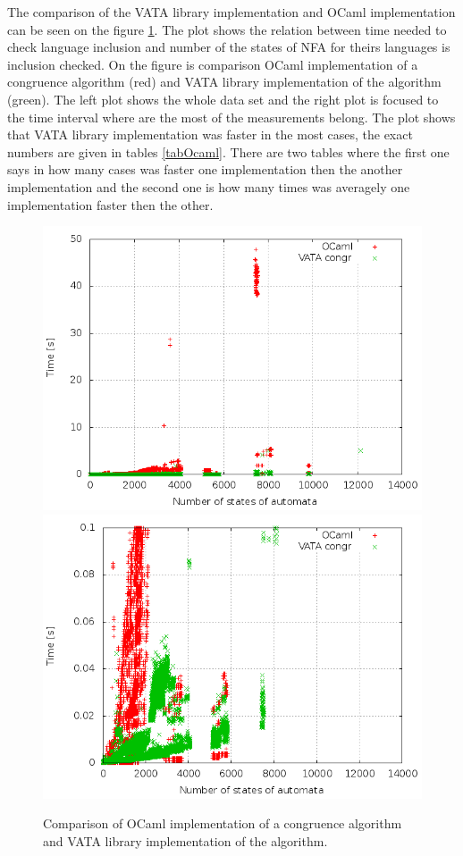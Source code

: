 The comparison of the VATA library implementation and OCaml implementation can be seen on the figure \ref{figGraphOCaml}. The plot shows the relation between 
time needed to check language inclusion and number of the states of NFA for theirs languages is inclusion checked.
On the figure is comparison OCaml implementation of a congruence algorithm (red) and VATA library implementation of the algorithm (green). The left plot shows
the whole data set and the right plot is focused to the time interval where are the most of the measurements belong. The plot shows that VATA library
implementation was faster in the most cases, the exact numbers are given in tables \ref{tabOcaml}. There are two tables where the first one says
in how many cases was faster one implementation then the another implementation and the second one
is how many times was averagely one implementation faster then the other.

\begin{figure}[bt]
\begin{center}
\includegraphics[scale=0.3]{fig/plot_hkc_zprava.png}
\includegraphics[scale=0.3]{fig/plot_hkc_step_zprava.png}
\label{figGraphOCaml}
\caption{
Comparison of OCaml implementation of a congruence algorithm and VATA library implementation of the algorithm.}
\end{center}
\end{figure}

